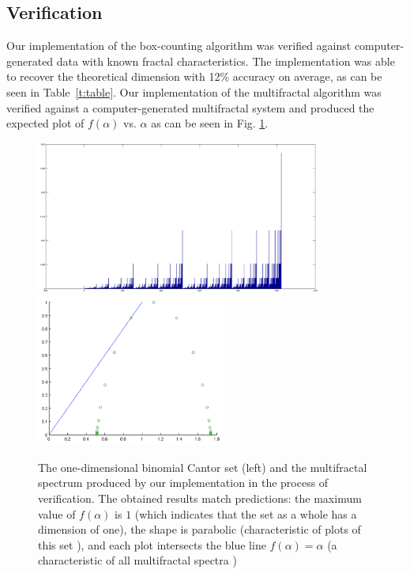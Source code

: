 \documentclass{emulateapj}
\begin{document}
\subsection{Verification}\label{Verification}

Our implementation of the box-counting algorithm was verified against computer-generated data with known fractal characteristics. The implementation was able to recover the theoretical dimension with 12\% accuracy on average, as can be seen in Table~\ref{t:table}. Our implementation of the multifractal algorithm was verified against a computer-generated multifractal system and produced the expected plot of $f(\alpha)$ vs. $\alpha$ as can be seen in Fig. \ref{f:cantorset}. 

\begin{figure}[ht]
	\begin{center}
	\includegraphics[height=5cm,clip=true]{Graphics/binomialcantor1024.png}%
	\includegraphics[height=5cm,clip=true]{Graphics/firstf(a)plot!.png}%
	\end{center}
	\caption{The one-dimensional binomial Cantor set (left) and the multifractal spectrum produced by our implementation in the process of verification. The obtained results match predictions: the maximum value of $f(\alpha)$ is $1$ (which indicates that the set as a whole has a dimension of one), the shape is parabolic (characteristic of plots of this set \citep{Chhabra1989}), and each plot intersects the blue line $f(\alpha) = \alpha$ (a characteristic of all multifractal spectra \citep{mandelbrotmultifractal})}
	\label{f:cantorset}
	\end{figure}
\end{document}
